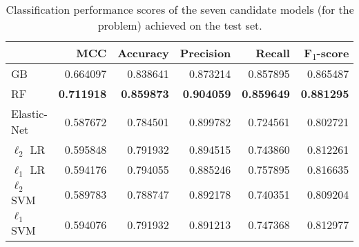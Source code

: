 \begin{table}

\begin{tabular}{lrrrrr}
\toprule
{} &       MCC &  Accuracy &  Precision &    Recall &        F\textsubscript{$1$}-score \\
\midrule
GB      &  0.664097 &  0.838641 &   0.873214 &  0.857895 &  0.865487 \\
RF         &  \textbf{0.711918} &  \textbf{0.859873} &   \textbf{0.904059} &  \textbf{0.859649} &  \textbf{0.881295} \\
Elastic-Net                   &  0.587672 &  0.784501 &   0.899782 &  0.724561 &  0.802721 \\
$\ell_2$ LR &  0.595848 &  0.791932 &   0.894515 &  0.743860 &  0.812261 \\
$\ell_1$ LR &  0.594176 &  0.794055 &   0.885246 &  0.757895 &  0.816635 \\
$\ell_2$ SVM          &  0.589783 &  0.788747 &   0.892178 &  0.740351 &  0.809204 \\
$\ell_1$ SVM          &  0.594076 &  0.791932 &   0.891213 &  0.747368 &  0.812977 \\
\bottomrule
\end{tabular}

\caption{Classification performance scores of the seven candidate models (for the \F problem) achieved on the test set.} \label{tab:f_final_scores}
\end{table}
